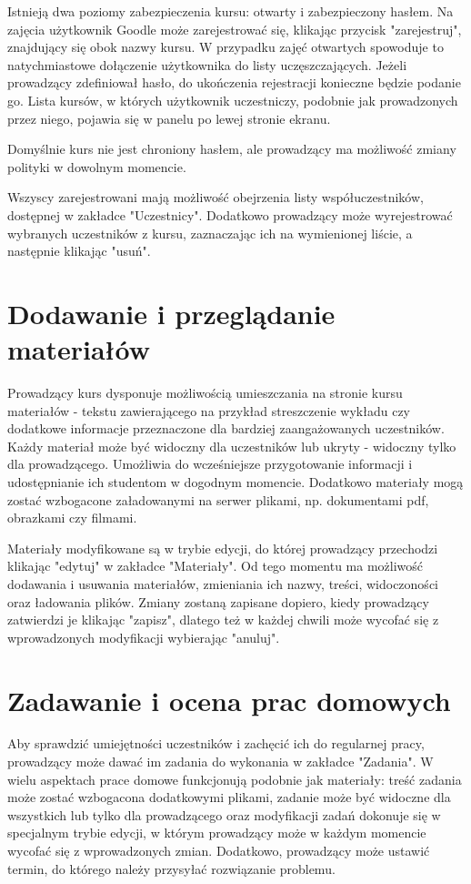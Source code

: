\documentclass{pracamgr}
\begin{document}
Istnieją dwa poziomy zabezpieczenia kursu: otwarty i zabezpieczony hasłem. 
Na zajęcia użytkownik Goodle może zarejestrować się, klikając przycisk 
"zarejestruj", znajdujący się obok nazwy kursu. W przypadku zajęć otwartych
spowoduje to natychmiastowe dołączenie użytkownika do listy uczęszczających.
Jeżeli prowadzący zdefiniował hasło, do ukończenia rejestracji konieczne będzie
podanie go. Lista kursów, w których użytkownik uczestniczy, podobnie
jak prowadzonych przez niego, pojawia się w panelu po lewej stronie ekranu.

Domyślnie kurs nie jest chroniony hasłem, ale prowadzący ma możliwość zmiany
polityki w dowolnym momencie. 

Wszyscy zarejestrowani mają możliwość obejrzenia listy współuczestników, 
dostępnej w zakładce "Uczestnicy". Dodatkowo prowadzący może
wyrejestrować wybranych uczestników z kursu, zaznaczając ich na wymienionej
liście, a następnie klikając "usuń". 

\section{Dodawanie i przeglądanie materiałów}

Prowadzący kurs dysponuje możliwością umieszczania na stronie kursu 
materiałów - tekstu zawierającego na przykład streszczenie wykładu czy
dodatkowe informacje przeznaczone dla bardziej zaangażowanych uczestników.
Każdy materiał może być widoczny dla uczestników lub ukryty - widoczny
tylko dla prowadzącego. Umożliwia do wcześniejsze przygotowanie informacji
i udostępnianie ich studentom w dogodnym momencie. Dodatkowo materiały mogą 
zostać wzbogacone załadowanymi na serwer plikami, np.
dokumentami pdf, obrazkami czy filmami.  

Materiały modyfikowane są w trybie edycji, do której prowadzący przechodzi
klikając "edytuj" w zakładce "Materiały". Od tego momentu ma możliwość
dodawania i usuwania materiałów, zmieniania ich nazwy, treści, widoczoności
oraz ładowania plików. Zmiany zostaną zapisane dopiero, kiedy prowadzący
zatwierdzi je klikając "zapisz", dlatego też w każdej chwili może 
wycofać się z wprowadzonych modyfikacji wybierając "anuluj".

\section{Zadawanie i ocena prac domowych}

Aby sprawdzić umiejętności uczestników i zachęcić ich do regularnej pracy,
prowadzący może dawać im zadania do wykonania w zakładce "Zadania". 
W wielu aspektach prace domowe funkcjonują podobnie jak materiały: 
treść zadania może zostać wzbogacona dodatkowymi plikami, zadanie może być
widoczne dla wszystkich lub tylko dla prowadzącego oraz modyfikacji
zadań dokonuje się w specjalnym trybie edycji, w którym prowadzący może
w każdym momencie wycofać się z wprowadzonych zmian. Dodatkowo, prowadzący
może ustawić termin, do którego należy przysyłać rozwiązanie problemu.
\end{document}
